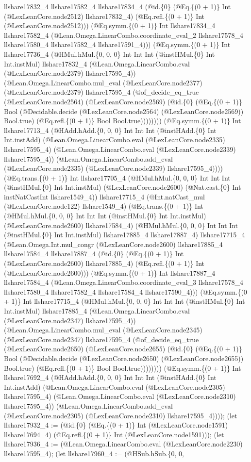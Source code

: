 \documentclass[11pt]{article}
\begin{document}
llshare17832\_4 llshare17582\_4 llshare17834\_4 (@id.\{0\} (@Eq.\{(0 + 1)\} Int (@LexLeanCore.node2512) llshare17832\_4) (@Eq.refl.\{(0 + 1)\} Int (@LexLeanCore.node2512))) (@Eq.symm.\{(0 + 1)\} Int llshare17834\_4 llshare17582\_4 (@Lean.Omega.LinearCombo.coordinate\_eval\_2 llshare17578\_4 llshare17580\_4 llshare17582\_4 llshare17591\_4))) (@Eq.symm.\{(0 + 1)\} Int llshare17736\_4 (@HMul.hMul.\{0, 0, 0\} Int Int Int (@instHMul.\{0\} Int Int.instMul) llshare17832\_4 (@Lean.Omega.LinearCombo.eval (@LexLeanCore.node2379) llshare17595\_4)) (@Lean.Omega.LinearCombo.mul\_eval (@LexLeanCore.node2377) (@LexLeanCore.node2379) llshare17595\_4 (@of\_decide\_eq\_true (@LexLeanCore.node2564) (@LexLeanCore.node2569) (@id.\{0\} (@Eq.\{(0 + 1)\} Bool (@Decidable.decide (@LexLeanCore.node2564) (@LexLeanCore.node2569)) Bool.true) (@Eq.refl.\{(0 + 1)\} Bool Bool.true)))))))) (@Eq.symm.\{(0 + 1)\} Int llshare17713\_4 (@HAdd.hAdd.\{0, 0, 0\} Int Int Int (@instHAdd.\{0\} Int Int.instAdd) (@Lean.Omega.LinearCombo.eval (@LexLeanCore.node2335) llshare17595\_4) (@Lean.Omega.LinearCombo.eval (@LexLeanCore.node2339) llshare17595\_4)) (@Lean.Omega.LinearCombo.add\_eval (@LexLeanCore.node2335) (@LexLeanCore.node2339) llshare17595\_4)))) (@Eq.trans.\{(0 + 1)\} Int llshare17705\_4 (@HMul.hMul.\{0, 0, 0\} Int Int Int (@instHMul.\{0\} Int Int.instMul) (@LexLeanCore.node2600) (@Nat.cast.\{0\} Int instNatCastInt llshare1549\_4)) llshare17715\_4 (@Int.natCast\_mul (@LexLeanCore.node122) llshare1549\_4) (@Eq.trans.\{(0 + 1)\} Int (@HMul.hMul.\{0, 0, 0\} Int Int Int (@instHMul.\{0\} Int Int.instMul) (@LexLeanCore.node2600) llshare17584\_4) (@HMul.hMul.\{0, 0, 0\} Int Int Int (@instHMul.\{0\} Int Int.instMul) llshare17885\_4 llshare17887\_4) llshare17715\_4 (@Lean.Omega.Int.mul\_congr (@LexLeanCore.node2600) llshare17885\_4 llshare17584\_4 llshare17887\_4 (@id.\{0\} (@Eq.\{(0 + 1)\} Int (@LexLeanCore.node2600) llshare17885\_4) (@Eq.refl.\{(0 + 1)\} Int (@LexLeanCore.node2600))) (@Eq.symm.\{(0 + 1)\} Int llshare17887\_4 llshare17584\_4 (@Lean.Omega.LinearCombo.coordinate\_eval\_3 llshare17578\_4 llshare17580\_4 llshare17582\_4 llshare17584\_4 llshare17590\_4))) (@Eq.symm.\{(0 + 1)\} Int llshare17715\_4 (@HMul.hMul.\{0, 0, 0\} Int Int Int (@instHMul.\{0\} Int Int.instMul) llshare17885\_4 (@Lean.Omega.LinearCombo.eval (@LexLeanCore.node2347) llshare17595\_4)) (@Lean.Omega.LinearCombo.mul\_eval (@LexLeanCore.node2345) (@LexLeanCore.node2347) llshare17595\_4 (@of\_decide\_eq\_true (@LexLeanCore.node2650) (@LexLeanCore.node2655) (@id.\{0\} (@Eq.\{(0 + 1)\} Bool (@Decidable.decide (@LexLeanCore.node2650) (@LexLeanCore.node2655)) Bool.true) (@Eq.refl.\{(0 + 1)\} Bool Bool.true)))))))) (@Eq.symm.\{(0 + 1)\} Int llshare17692\_4 (@HAdd.hAdd.\{0, 0, 0\} Int Int Int (@instHAdd.\{0\} Int Int.instAdd) (@Lean.Omega.LinearCombo.eval (@LexLeanCore.node2305) llshare17595\_4) (@Lean.Omega.LinearCombo.eval (@LexLeanCore.node2310) llshare17595\_4)) (@Lean.Omega.LinearCombo.add\_eval (@LexLeanCore.node2305) (@LexLeanCore.node2310) llshare17595\_4)))); (let llshare17932\_4 := (@id.\{0\} (@Eq.\{(0 + 1)\} Int (@LexLeanCore.node1591) llshare17694\_4) (@Eq.refl.\{(0 + 1)\} Int (@LexLeanCore.node1591))); (let llshare17936\_4 := (@Lean.Omega.LinearCombo.eval (@LexLeanCore.node2230) llshare17595\_4); (let llshare17960\_4 := (@HSub.hSub.\{0, 0, 
\end{document}
